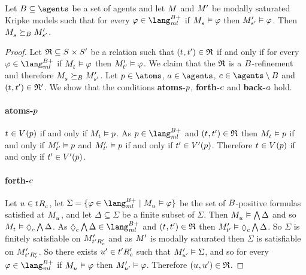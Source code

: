 \begin{proposition}
Let $\agentsB \subseteq \agents$ be a set of agents and let $\kModel$ and ${M^{\prime}_{}}$ be modally saturated Kripke models such that for every $\phi \in \langMlPlusBs$ if $\kPModel{\kStateS} \entails \phi$ then ${M^{\prime}_{{s}^{\prime}}} \vDash \varphi$.
Then $\kPModel{\kStateS} \simulatesBs \kPModelP{\kStateSP}$.
\end{proposition}

\begin{proof}
Let $\refinement \subseteq \kStates \times \kStatesP$ be a relation such that $(\kStateT, \kStateTP) \in \refinement$ if and only if for every $\phi \in \langMlPlusBs$ if $\kPModel{\kStateT} \entails \phi$ then ${M^{\prime}_{{t}^{\prime}}} \vDash \varphi$.
We claim that the $\mathfrak{R}$ is a $B$-refinement and therefore $\kPModel{\kStateS} \simulatesBs \kPModelP{\kStateSP}$.
Let $\atomP \in \atoms$, $\agentA \in \agents$, $\agentC \in \agents \setminus \agentsB$ and $(\kStateT, \kStateTP) \in \refinement'$.
We show that the conditions {\bf atoms-$p$}, {\bf forth-$c$} and {\bf back-$a$} hold.

\paragraph{atoms-$p$}
$\kStateT \in \kValuation(\atomP)$ if and only if $\kPModel{\kStateT} \entails \atomP$.
As $\atomP \in \langMlPlusBs$ and $(\kStateT, \kStateTP) \in \refinement$ then $\kPModel{\kStateT} \entails \atomP$ if and only if ${M^{\prime}_{{t}^{\prime}}} \vDash p$
and ${M^{\prime}_{{t}^{\prime}}} \vDash p$ if and only if ${t}^{\prime} \in {V^{\prime}}(p)$.
Therefore $\kStateT \in \kValuation(\atomP)$ if and only if ${t}^{\prime} \in {V^{\prime}}(p)$.

\paragraph{forth-$c$}
Let $\kStateU \in \kSuccessorsC{\kStateT}$, let $\Sigma = \{\phi \in \langMlPlusBs \mid \kPModel{\kStateU} \entails \phi\}$ be the set of $B$-positive formulas satisfied at $\kPModel{\kStateU}$, and let $\Delta \subseteq \Sigma$ be a finite subset of $\Sigma$.
Then $\kPModel{\kStateU} \entails \bigwedge \Delta$ and so $\kPModel{\kStateT} \entails \possibleC \bigwedge \Delta$.
As $\possibleC \bigwedge \Delta \in \langMlPlusBs$ and $(\kStateT, \kStateTP) \in \refinement$ then $\kPModelP{\kStateTP} \entails \possibleC \bigwedge \Delta$.
So $\Sigma$ is finitely satisfiable on ${M^{\prime}_{{{t}^{\prime}} {R^{\prime}_{c}}}}$ and as ${M^{\prime}_{}}$ is modally saturated then $\Sigma$ is satisfiable on ${M^{\prime}_{{{t}^{\prime}} {R^{\prime}_{c}}}}$.
So there exists ${u}^{\prime} \in {{t}^{\prime}} {R^{\prime}_{c}}$ such that ${M^{\prime}_{{u}^{\prime}}} \vDash \Sigma$, and so for every $\phi \in \langMlPlusBs$ if $\kPModel{\kStateU} \entails \phi$ then ${M^{\prime}_{{u}^{\prime}}} \vDash \varphi$.
Therefore $(\kStateU, \kStateUP) \in \refinement$.


\end{proof}
